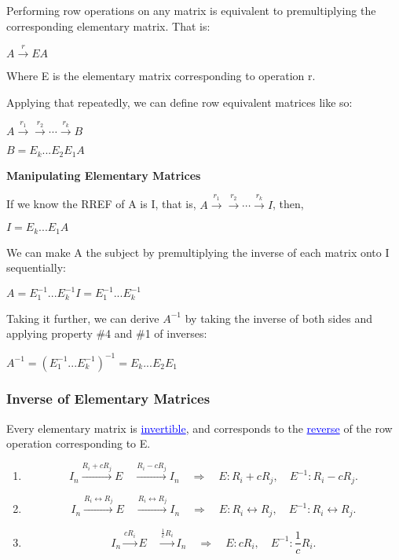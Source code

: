 \documentclass{article}
\newcommand{\bul}[1]{\textcolor{blue}{\underline{#1}}}
\newcommand{\sub}[1]{\vspace{10pt}\textbf{#1}}
\newcommand{\sbreak}{\vspace{10pt}}
\newcommand{\ssbreak}{\vspace{5pt}}
\begin{document}
\ssbreak

Performing row operations on any matrix is equivalent to premultiplying the corresponding elementary matrix. That is:

\begin{center}
    $A \overset{r}{\rightarrow} EA$
\end{center}
Where E is the elementary matrix corresponding to operation r.

\sbreak

Applying that repeatedly, we can define row equivalent matrices like so:
\begin{center}
    $A \overset{r_1}{\rightarrow} \overset{r_2}{\rightarrow} \cdots \overset{r_k}{\rightarrow} B$
    
    \ssbreak

    $B = E_k...E_2E_1A$
\end{center}

\sub{Manipulating Elementary Matrices}

If we know the RREF of A is I, that is, $A \overset{r_1}{\rightarrow} \overset{r_2}{\rightarrow} \cdots \overset{r_k}{\rightarrow} I$, then,
\begin{center}
    $I = E_k...E_1A$
\end{center}

We can make A the subject by premultiplying the inverse of each matrix onto I sequentially:
\begin{center}
    $A = E_1^{-1}...E_k^{-1}I = E_1^{-1}...E_k^{-1}$
\end{center}

Taking it further, we can derive $A^{-1}$ by taking the inverse of both sides and applying property \#4 and \#1 of inverses:
\begin{center}
    $A^{-1} = (E_1^{-1}...E_k^{-1})^{-1} = E_k...E_2E_1$
\end{center}

\subsubsection{Inverse of Elementary Matrices}
Every elementary matrix is \bul{invertible}, and corresponds to the \bul{reverse} of the row operation corresponding to E.

\begin{enumerate}
    \item 
    \[
    I_n \overset{R_i + cR_j}{\longrightarrow} E \quad \overset{R_i - cR_j}{\longrightarrow} I_n \quad \Rightarrow \quad E: R_i + cR_j, \quad E^{-1}: R_i - cR_j.
    \]
    
    \item 
    \[
    I_n \overset{R_i \leftrightarrow R_j}{\longrightarrow} E \quad \overset{R_i \leftrightarrow R_j}{\longrightarrow} I_n \quad \Rightarrow \quad E: R_i \leftrightarrow R_j, \quad E^{-1}: R_i \leftrightarrow R_j.
    \]
    
    \item 
    \[
    I_n \overset{cR_i}{\longrightarrow} E \quad \overset{\frac{1}{c}R_i}{\longrightarrow} I_n \quad \Rightarrow \quad E: cR_i, \quad E^{-1}: \frac{1}{c}R_i.
    \]
\end{enumerate}
\end{document}
